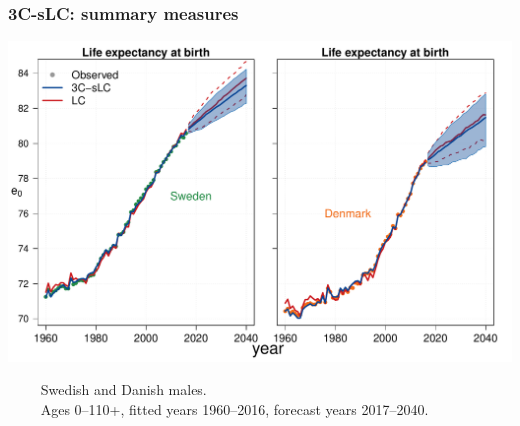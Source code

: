 \documentclass[12pt, xcolor=table]{beamer}  %
\begin{document}
\begin{frame}[noframenumbering]\frametitle{3C-sLC: summary measures}

\vspace{-0.5cm}
	
	\begin{center}	
		\vspace{0.4cm}
		
		\includegraphics[scale=.42]{Figures/Ch5/F1_2_M}
		
	\end{center}

\vspace{-0.3cm}
\tiny{$\quad\quad$ Swedish and Danish males. \\ $\quad\quad$ Ages 0--110+, fitted years 1960--2016, forecast years 2017--2040.}
	
\end{frame}
\end{document}
